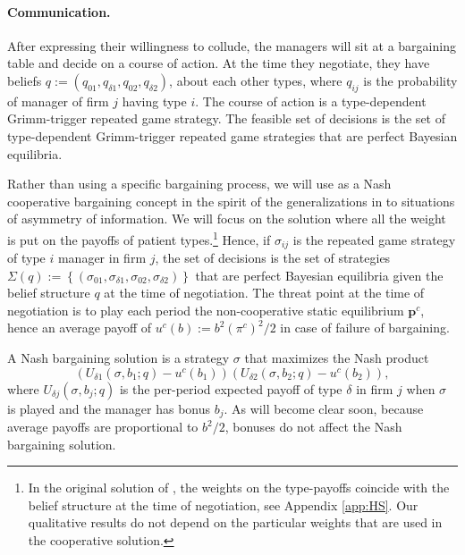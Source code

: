 \documentclass[]{article}
\newcommand{\p}{\mathbf p}
\begin{document}
\paragraph{Communication.} After expressing their willingness to collude, the managers will sit at a bargaining table and decide on a course of action. At the time they negotiate, they have beliefs $q:=(q_{01},q_{\delta 1},q_{02},q_{\delta 2})$, about each other types, where $q_{ij}$ is the probability of manager of firm $j$ having type $i$. The course of action is a type-dependent Grimm-trigger repeated game strategy. The feasible set of decisions is the set of type-dependent Grimm-trigger repeated game strategies that are perfect Bayesian equilibria. 

Rather than using a specific bargaining process, we will use as a Nash cooperative bargaining concept in the spirit of the generalizations in  \cite{Harsanyi1972,Myerson1984,Weidner1992} to situations of asymmetry of information. We will focus on the solution where all the weight is put on the payoffs of patient types.\footnote{%
In the original solution of \cite{Harsanyi1972}, the weights on the type-payoffs coincide with the belief structure at the time of negotiation, see Appendix \ref{app:HS}. Our qualitative results do not depend on the particular weights that are used in the cooperative solution.} Hence, if $\sigma_{ij}$ is the repeated game strategy of type $i$ manager in firm $j$, the set of decisions is the set of strategies $\Sigma(q):=\left\{(\sigma_{01},\sigma_{\delta 1},\sigma_{02},\sigma_{\delta 2})\right\}$ that are perfect Bayesian equilibria given the belief structure $q$ at the time of negotiation. The threat point at the time of negotiation is to play each period the non-cooperative static equilibrium $\p^c$, hence an average payoff of $u^c(b):=b^2(\pi^c)^2/2$ in case of failure of bargaining. 

A Nash bargaining solution is a strategy $\sigma$ that maximizes the Nash product 
\[\left(U_{\delta 1}(\sigma,b_1;q)-u^c(b_1)\right)\left(U_{\delta 2}(\sigma,b_2;q)-u^c(b_2)\right),\]
 where $U_{\delta j}(\sigma,b_j;q)$ is the per-period expected payoff of type $\delta$ in firm $j$ when $\sigma$ is played and the manager has bonus $b_j$. As will become clear soon, because average payoffs are proportional to $b^2/2$, bonuses do not affect the Nash bargaining solution.
\end{document}
